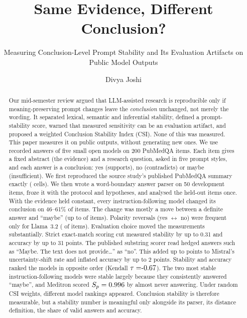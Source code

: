 \documentclass[acmsmall]{acmart}
\begin{document}
\title[Prompt Sensitivity and Conclusion Stability]{Same Evidence, Different Conclusion?}
\subtitle{Measuring Conclusion-Level Prompt Stability and Its Evaluation Artifacts on Public Model Outputs}

\author{Divya Joshi}

\begin{abstract}
Our mid-semester review argued that LLM-assisted research is reproducible only if meaning-preserving prompt changes leave the \emph{conclusion} unchanged, not merely the wording. It separated lexical, semantic and inferential stability, defined a prompt-stability score, warned that measured sensitivity can be an evaluation artifact, and proposed a weighted Conclusion Stability Index (CSI). None of this was measured. This paper measures it on public outputs, without generating new ones. We use \NOutAll{} recorded answers of five small open models on 200 PubMedQA items. Each item gives a fixed abstract (the evidence) and a research question, asked in five prompt styles, and each answer is a conclusion: yes (supports), no (contradicts) or maybe (insufficient). We first reproduced the source study's published PubMedQA summary exactly (\ReproCells{} cells). We then wrote a word-boundary answer parser on 50 development items, froze it with the protocol and hypotheses, and analysed the \NTest{} held-out items once. With the evidence held constant, every instruction-following model changed its conclusion on 46--61\% of items. The change was mostly a move between a definite answer and ``maybe'' (up to \UncPhi{} of items). Polarity reversals (yes $\leftrightarrow$ no) were frequent only for Llama~3.2 (\RevLlama{} of items). Evaluation choice moved the measurements substantially. Strict exact-match scoring cut measured stability by up to 0.31 and accuracy by up to 31 points. The published substring scorer read hedged answers such as ``Maybe. The text does not provide\ldots'' as ``no''. This added up to \dUncEtwoMistral{} points to Mistral's uncertainty-shift rate and inflated accuracy by up to 2 points. Stability and accuracy ranked the models in opposite order (Kendall $\tau=\HthreeTau$). The two most stable instruction-following models were stable largely because they consistently answered ``maybe'', and Meditron scored $S_p=0.996$ by almost never answering. Under random CSI weights, \CSIorders{} different model rankings appeared. Conclusion stability is therefore measurable, but a stability number is meaningful only alongside its parser, its distance definition, the share of valid answers and accuracy.
\end{abstract}
\end{document}

